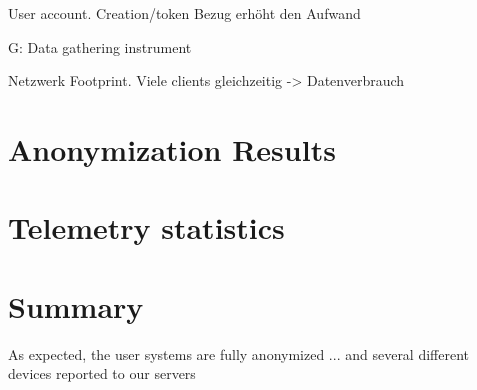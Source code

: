 
User account. Creation/token Bezug erhöht den Aufwand

G: Data gathering instrument

Netzwerk Footprint. Viele clients gleichzeitig -> Datenverbrauch

%
\newpage
%
 


\section{Anonymization Results}
\label{sec:results:anon}


%


\section{Telemetry statistics}
\label{sec:results:telemetry}
%


\section{Summary}
As expected, the user systems are fully anonymized ... and several different devices reported to our servers
